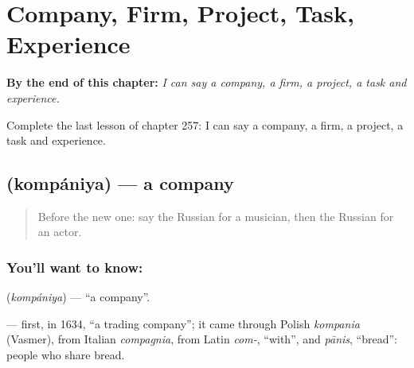 
\chapter{Company, Firm, Project, Task, Experience}
\label{ch:ru-company-firm-project-task-experience}

\begin{chapteropening}
\textbf{By the end of this chapter:} \emph{I can say a company, a firm, a project, a task and experience.}

Complete the last lesson of chapter 257: I can say a company, a firm, a project, a task and experience.
\end{chapteropening}

\section[\texorpdfstring{\ru{компания} (kompániya)}{компания (kompániya)}]{ (kompániya) — a company}

\label{lesson:RU-C257-kompaniya}



\begin{quote}
Before the new one: say the Russian for a musician, then the Russian for an actor.
\end{quote}

\subsection*{You'll want to know: }
\textbf{} (\emph{kompániya}) — \textquotedblleft{}a company\textquotedblright{}.

\begin{cousinweb}
\textbf{} — first, in 1634, \textquotedblleft{}a trading company\textquotedblright{}; it came through Polish \emph{kompania} (Vasmer), from Italian \emph{compagnia}, from Latin \emph{com-}, \textquotedblleft{}with\textquotedblright{}, and \emph{pānis}, \textquotedblleft{}bread\textquotedblright{}: people who share bread.
\end{cousinweb}

